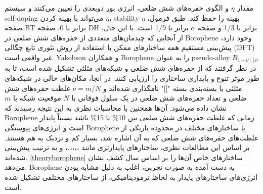 مقدار $\eta$ و الگوی حفره‌های شش ضلعی، انرژی بور دوبعدی را تعیین می‌کنند و سیستم \gls{self-doping} می‌تواند با بهینه کردن $\eta$، \gls{stability} بهینه را حفظ کند. طبق فرمول، $\eta$ صفحه \gls{BT} برابر با 0، صفحه \gls{DH} برابر با 1/3 و صفحه $\alpha$ برابر با 1/9 است. \cite{yuPredictionTwoDimensionalBoron2012} با این حال، از آنجایی که چیدمان‌های متعددی از حفره‌های شش ضلعی در \gls{Borophene} وجود دارد، پیش‌بینی مستقیم همه ساختارهای ممکن با استفاده از روش تئوری تابع چگالی (\gls{DFT}) غیر واقعی است. \gls{Yakobson} و همکاران \cite{penevPolymorphismTwoDimensionalBoron2012} \gls{Borophene} را به عنوان \gls{pseudo-alloy} $B_{1-\nu[]\nu}$ در نظر گرفتند که از حفره‌های شش ضلعی و شبکه‌های مثلثی تشکیل شده است، تا به طور مؤثر تنوع و پایداری ساختاری را ارزیابی کنند. در آنجا، مکان‌های خالی در شبکه‌های مثلثی با بسته‌بندی بسته "[]" نامگذاری شده‌اند و $\nu = m/N$ غلظت حفره‌های شش ضلعی و تعداد حفره‌های شش ضلعی در یک سلول فوقانی با $N$ موقعیت شبکه با $m$ نشان داده می‌شود.\cite{zhangTwodimensionalBoronStructures2017} آن‌ها همچنین با محاسبات نظری به این نتیجه رسیدند که \gls{Borophene} زمانی که غلظت حفره‌های شش ضلعی بین 10\% تا 15\% باشد نسبتاً پایدار است و انرژی‌های پیوستگی \gls{Borophene} با ساختارهای مختلف در محدوده باریکی از غلظت‌های حفره‌های شش ضلعی که به آن اشاره شد، بسیار کم و نزدیک به هم هستند. بر اساس این مطالعات نظری، ساختارهای پایدارتری مانند ،،،،،، و به ترتیب پیش‌بینی شده‌اند. \cite{zhouSemimetallicTwoDimensionalBoron2014, wuTwoDimensionalBoronMonolayer2012, penevPolymorphismTwoDimensionalBoron2012, yuPredictionTwoDimensionalBoron2012, zopeSnubBoronNanostructures2011} \ref{theoryborophene} ساختارهای خاص آن‌ها را بر اساس سال کشف نشان می‌دهد. \gls{Borophene} به دست آمده به صورت تجربی، اغلب به دلیل مشابه بودن انرژی‌های ساختارهای پایدار به لحاظ ترمودینامیکی، از ساختارهای مختلفی تشکیل شده است.

